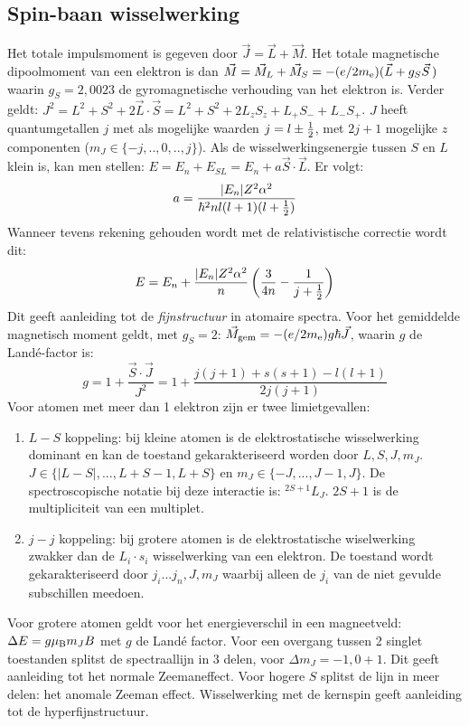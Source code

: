 \subsection[~~Spin-baan wisselwerking]{Spin-baan wisselwerking}
Het totale impulsmoment is gegeven door $\vec{J}=\vec{L}+\vec{M}$. Het totale
magnetische dipoolmoment van een elektron is dan
$\vec{M}=\vec{M}_L+\vec{M}_S=-(e/2m_{\rm e})(\vec{L}+g_S\vec{S}\,)$ waarin
$g_S=2,0023$ de gyromagnetische verhouding van het elektron is. Verder
geldt: $J^2=L^2+S^2+2\vec{L}\cdot\vec{S}=L^2+S^2+2L_zS_z+L_+S_-+L_-S_+$.
$J$ heeft quantumgetallen $j$ met als mogelijke waarden $j=l\pm\mbox{$\frac{1}{2}$}$, met
$2j+1$ mogelijke $z$ componenten ($m_J\in\{-j,..,0,..,j\}$). Als de
wisselwerkingsenergie tussen $S$ en $L$ klein is, kan men stellen:
$E=E_n+E_{SL}=E_n+a\vec{S}\cdot\vec{L}$. Er volgt:
\[
a=\frac{|E_n|Z^2\alpha^2}{\hbar^2nl(l+1)(l+\mbox{$\frac{1}{2}$})}
\]
Wanneer tevens rekening gehouden wordt met de relativistische correctie wordt
dit:
\[
E=E_n+\frac{|E_n|Z^2\alpha^2}{n}\left(\frac{3}{4n}-\frac{1}{j+\mbox{$\frac{1}{2}$}}\right)
\]
Dit geeft aanleiding tot de {\it fijnstructuur} in atomaire spectra. Voor het
gemiddelde magnetisch moment geldt, met $g_S=2$:
$\vec{M}_{\rm gem}=-(e/2m_{\rm e})g\hbar\vec{J}$, waarin $g$ de
Land\'e-factor is:
\[
g=1+\frac{\vec{S}\cdot\vec{J}}{J^2}=1+\frac{j(j+1)+s(s+1)-l(l+1)}{2j(j+1)}
\]
Voor atomen met meer dan 1 elektron zijn er twee limietgevallen:
\begin{enumerate}
\item $L-S$ koppeling: bij kleine atomen is de elektrostatische wisselwerking
      dominant en kan de toestand gekarakteriseerd worden door $L,S,J,m_J$.
      $J\in\{|L-S|,...,L+S-1,L+S\}$ en $m_J\in\{-J,...,J-1,J\}$. De
      spectroscopische notatie bij deze interactie is: $^{2S+1}L_J$. $2S+1$
      is de multipliciteit van een multiplet.
\item $j-j$ koppeling: bij grotere atomen is de elektrostatische wiselwerking
      zwakker dan de $L_i\cdot s_i$ wisselwerking van een elektron. De
      toestand wordt gekarakteriseerd door $j_i...j_n,J,m_J$ waarbij alleen
      de $j_i$ van de niet gevulde subschillen meedoen.
\end{enumerate}
Voor grotere atomen geldt voor het energieverschil in een magneetveld:
$\Delta E=g\mu_{\rm B}m_JB$ met $g$ de Land\'e factor. Voor een overgang
tussen 2 singlet toestanden splitst de spectraallijn in 3 delen, voor
$\Delta m_J=-1,0+1$. Dit geeft aanleiding tot het normale Zeemaneffect. Voor
hogere $S$ splitst de lijn in meer delen: het anomale Zeeman effect.
\npar
Wisselwerking met de kernspin geeft aanleiding tot de hyperfijnstructuur.

